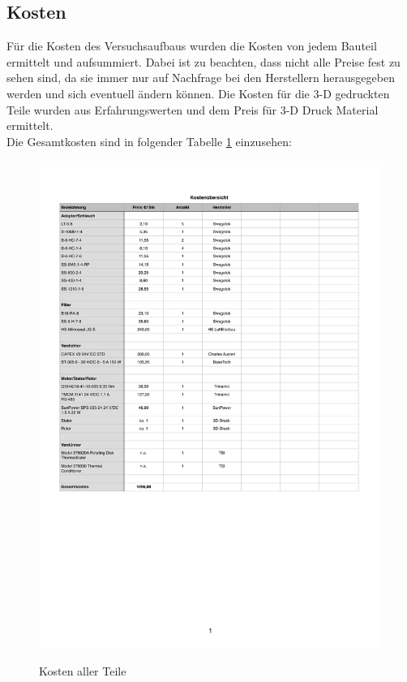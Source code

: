 \subsection{Kosten}
F\"{u}r die Kosten des Versuchsaufbaus wurden die Kosten von jedem Bauteil ermittelt und aufsummiert. Dabei ist zu beachten, dass nicht alle Preise fest zu sehen sind, da sie immer nur auf Nachfrage bei den Herstellern herausgegeben werden und sich eventuell \"{a}ndern k\"{o}nnen. Die Kosten f\"{u}r die 3-D gedruckten Teile wurden aus Erfahrungswerten und dem Preis f\"{u}r 3-D Druck Material ermittelt.\\
Die Gesamtkosten sind in folgender Tabelle \ref{fig:kosten} einzusehen:
\begin{figure}[H]
        \myfloatalign
        {\includegraphics[width=.9\linewidth]{gfx/construction/kosten.pdf}} \quad
        \caption[Kosten aller Teile]
        {Kosten aller Teile}
        \label{fig:kosten}
\end{figure}

